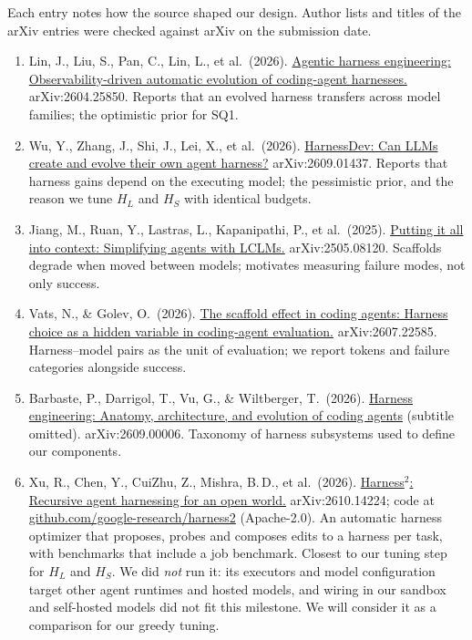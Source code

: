 \documentclass[11pt]{article}
\begin{document}
Each entry notes how the source shaped our design. Author lists and titles of the arXiv entries were checked against arXiv on the submission date.

\begin{enumerate}[leftmargin=*, itemsep=4pt]
  \item Lin, J., Liu, S., Pan, C., Lin, L., et al.\ (2026). \href{https://arxiv.org/abs/2604.25850}{Agentic harness engineering: Observability-driven automatic evolution of coding-agent harnesses.} arXiv:2604.25850. Reports that an evolved harness transfers across model families; the optimistic prior for SQ1.
  \item Wu, Y., Zhang, J., Shi, J., Lei, X., et al.\ (2026). \href{https://arxiv.org/abs/2609.01437}{HarnessDev: Can LLMs create and evolve their own agent harness?} arXiv:2609.01437. Reports that harness gains depend on the executing model; the pessimistic prior, and the reason we tune $H_L$ and $H_S$ with identical budgets.
  \item Jiang, M., Ruan, Y., Lastras, L., Kapanipathi, P., et al.\ (2025). \href{https://arxiv.org/abs/2505.08120}{Putting it all into context: Simplifying agents with LCLMs.} arXiv:2505.08120. Scaffolds degrade when moved between models; motivates measuring failure modes, not only success.
  \item Vats, N., \& Golev, O.\ (2026). \href{https://arxiv.org/abs/2607.22585}{The scaffold effect in coding agents: Harness choice as a hidden variable in coding-agent evaluation.} arXiv:2607.22585. Harness--model pairs as the unit of evaluation; we report tokens and failure categories alongside success.
  \item Barbaste, P., Darrigol, T., Vu, G., \& Wiltberger, T.\ (2026). \href{https://arxiv.org/abs/2609.00006}{Harness engineering: Anatomy, architecture, and evolution of coding agents} (subtitle omitted). arXiv:2609.00006. Taxonomy of harness subsystems used to define our components.
  \item Xu, R., Chen, Y., CuiZhu, Z., Mishra, B.\,D., et al.\ (2026). \href{https://arxiv.org/abs/2610.14224}{Harness$^2$: Recursive agent harnessing for an open world.} arXiv:2610.14224; code at \href{https://github.com/google-research/harness2}{github.com/google-research/harness2} (Apache-2.0). An automatic harness optimizer that proposes, probes and composes edits to a harness per task, with benchmarks that include a job benchmark. Closest to our tuning step for $H_L$ and $H_S$. We did \emph{not} run it: its executors and model configuration target other agent runtimes and hosted models, and wiring in our sandbox and self-hosted models did not fit this milestone. We will consider it as a comparison for our greedy tuning.

\end{enumerate}
\end{document}
